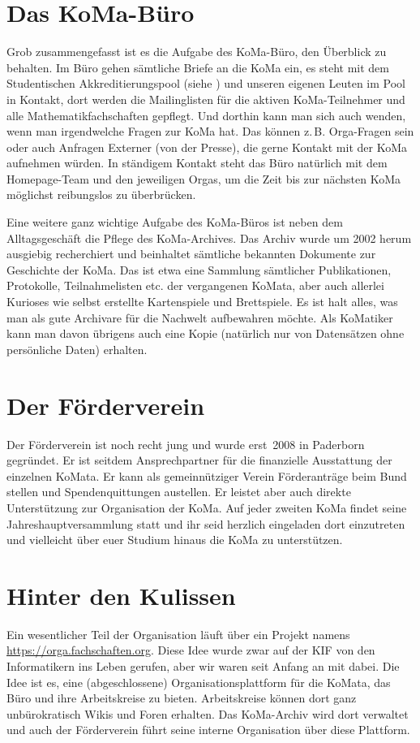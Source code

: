 \documentclass{neulingsheft}
\begin{document}
{\section{Das KoMa-Büro}
Grob zusammengefasst ist es die Aufgabe des KoMa-Büro, den Überblick zu
behalten. Im Büro gehen sämtliche Briefe an die KoMa ein, es steht mit dem
Studentischen Akkreditierungspool (siehe ) und unseren
eigenen Leuten im Pool in Kontakt, dort werden die Mailinglisten für die
aktiven KoMa-Teilnehmer und alle Mathematikfachschaften gepflegt. Und dorthin
kann man sich auch wenden, wenn man irgendwelche Fragen zur KoMa hat. Das
können z.\,B. Orga-Fragen sein oder auch Anfragen Externer (von der Presse),
die gerne Kontakt mit der KoMa aufnehmen würden. In ständigem Kontakt steht das
Büro natürlich mit dem Homepage-Team und den jeweiligen Orgas, um die Zeit bis
zur nächsten KoMa möglichst reibungslos zu überbrücken.

Eine weitere ganz wichtige Aufgabe des KoMa-Büros ist neben dem Alltagsgeschäft
die Pflege des KoMa-Archives. Das Archiv wurde um 2002 herum ausgiebig
recherchiert und beinhaltet sämtliche bekannten Dokumente zur Geschichte der
KoMa. Das ist etwa eine Sammlung sämtlicher Publikationen, Protokolle,
Teilnahmelisten etc. der vergangenen KoMata, aber auch allerlei Kurioses wie
selbst erstellte Kartenspiele und Brettspiele. Es ist halt alles, was man als
gute Archivare für die Nachwelt aufbewahren möchte. Als KoMatiker kann man
davon übrigens auch eine Kopie (natürlich nur von Datensätzen ohne persönliche
Daten) erhalten.

\section{Der Förderverein}
Der Förderverein ist noch recht jung und wurde erst~2008 in %
Paderborn gegründet. Er ist seitdem Ansprechpartner für die finanzielle
Ausstattung der einzelnen KoMata. Er kann als gemeinnütziger Verein
Förderanträge beim Bund stellen und Spendenquittungen austellen. Er leistet
aber auch direkte Unterstützung zur Organisation der KoMa. Auf jeder zweiten
KoMa findet seine Jahreshauptversammlung statt und ihr seid herzlich eingeladen
dort einzutreten und vielleicht über euer Studium hinaus die KoMa zu
unterstützen.

\section{Hinter den Kulissen}
Ein wesentlicher Teil der Organisation läuft über ein Projekt namens
\url{https://orga.fachschaften.org}. Diese Idee wurde zwar auf der KIF von den
Informatikern ins Leben gerufen, aber wir waren seit Anfang an mit dabei. Die
Idee ist es, eine (abgeschlossene) Organisationsplattform für die KoMata, das
Büro und ihre Arbeitskreise zu bieten. Arbeitskreise können dort ganz
unbürokratisch Wikis und Foren erhalten. Das KoMa-Archiv wird dort verwaltet
und auch der Förderverein führt seine interne Organisation über diese
Plattform.

}
\end{document}
